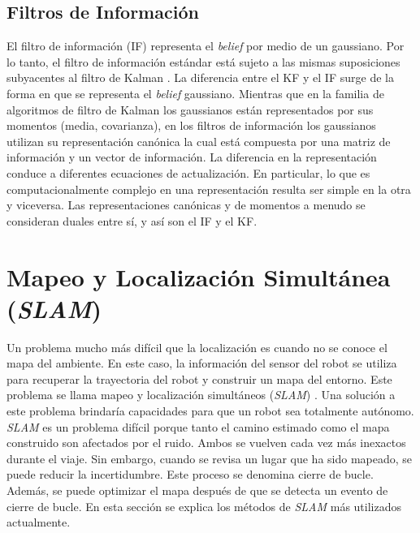 \subsection{Filtros de Informaci\'on}
El filtro de informaci\'on (IF) representa el \textit{belief} por medio de un 
gaussiano. Por lo tanto, el filtro de informaci\'on est\'andar est\'a sujeto a las 
mismas suposiciones subyacentes al filtro de Kalman \cite{thrun2005multi}. La 
diferencia entre el KF y el IF surge de la forma en que se representa el \textit{belief} 
gaussiano. Mientras que en la familia de algoritmos de filtro de Kalman los 
gaussianos est\'an representados por sus momentos (media, covarianza), en los 
filtros de informaci\'on los gaussianos utilizan su representaci\'on can\'onica la cual
est\'a compuesta por una matriz de informaci\'on y un vector de informaci\'on. La 
diferencia en la representaci\'on conduce a diferentes ecuaciones de 
actualizaci\'on. En particular, lo que es computacionalmente complejo en una 
representaci\'on resulta ser simple en la otra y viceversa. Las representaciones 
can\'onicas y de momentos a menudo se consideran duales entre s\'i, y as\'i son el 
IF y el KF.

\section{Mapeo y Localizaci\'on Simult\'anea (\textit{SLAM})}
Un problema mucho m\'as dif\'icil que la localizaci\'on es cuando no se conoce el 
mapa del ambiente. En este caso, la informaci\'on del sensor del robot se utiliza 
para recuperar la trayectoria del robot y construir un mapa del entorno. Este problema 
se llama mapeo y localizaci\'on simult\'aneos (\textit{SLAM}) \cite{Thrun2005}. Una 
soluci\'on a este problema brindaría capacidades para que un robot sea totalmente 
aut\'onomo. \textit{SLAM} es un problema dif\'icil porque tanto el camino estimado 
como el mapa construido son afectados por el ruido. Ambos se vuelven cada vez m\'as 
inexactos durante el viaje. Sin embargo, cuando se revisa un lugar que ha sido 
mapeado, se puede reducir la incertidumbre. Este proceso se denomina cierre de 
bucle. Adem\'as, se puede optimizar el mapa despu\'es de que se detecta un evento 
de cierre de bucle. En esta secci\'on se explica los m\'etodos de \textit{SLAM} 
más utilizados actualmente.


